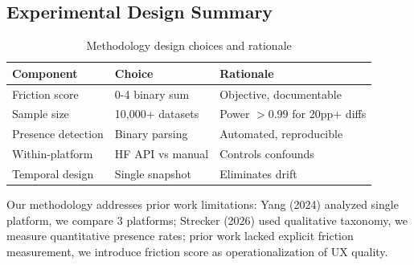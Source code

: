 \subsection{Experimental Design Summary}

\begin{table}[h]
\centering
\caption{Methodology design choices and rationale}
\label{tab:methodology_design}
\begin{tabular}{lll}
\toprule
Component & Choice & Rationale \\
\midrule
Friction score & 0-4 binary sum & Objective, documentable \\
Sample size & 10,000+ datasets & Power $>0.99$ for 20pp+ diffs \\
Presence detection & Binary parsing & Automated, reproducible \\
Within-platform & HF API vs manual & Controls confounds \\
Temporal design & Single snapshot & Eliminates drift \\
\bottomrule
\end{tabular}
\end{table}

Our methodology addresses prior work limitations: Yang (2024) analyzed single platform, we compare 3 platforms; Strecker (2026) used qualitative taxonomy, we measure quantitative presence rates; prior work lacked explicit friction measurement, we introduce friction score as operationalization of UX quality.

